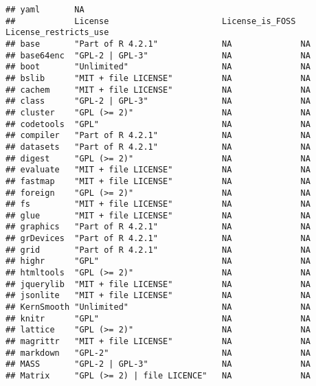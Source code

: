\documentclass[
]{article}
\begin{document}
\begin{verbatim}
## yaml       NA                                                                   
##            License                       License_is_FOSS License_restricts_use
## base       "Part of R 4.2.1"             NA              NA                   
## base64enc  "GPL-2 | GPL-3"               NA              NA                   
## boot       "Unlimited"                   NA              NA                   
## bslib      "MIT + file LICENSE"          NA              NA                   
## cachem     "MIT + file LICENSE"          NA              NA                   
## class      "GPL-2 | GPL-3"               NA              NA                   
## cluster    "GPL (>= 2)"                  NA              NA                   
## codetools  "GPL"                         NA              NA                   
## compiler   "Part of R 4.2.1"             NA              NA                   
## datasets   "Part of R 4.2.1"             NA              NA                   
## digest     "GPL (>= 2)"                  NA              NA                   
## evaluate   "MIT + file LICENSE"          NA              NA                   
## fastmap    "MIT + file LICENSE"          NA              NA                   
## foreign    "GPL (>= 2)"                  NA              NA                   
## fs         "MIT + file LICENSE"          NA              NA                   
## glue       "MIT + file LICENSE"          NA              NA                   
## graphics   "Part of R 4.2.1"             NA              NA                   
## grDevices  "Part of R 4.2.1"             NA              NA                   
## grid       "Part of R 4.2.1"             NA              NA                   
## highr      "GPL"                         NA              NA                   
## htmltools  "GPL (>= 2)"                  NA              NA                   
## jquerylib  "MIT + file LICENSE"          NA              NA                   
## jsonlite   "MIT + file LICENSE"          NA              NA                   
## KernSmooth "Unlimited"                   NA              NA                   
## knitr      "GPL"                         NA              NA                   
## lattice    "GPL (>= 2)"                  NA              NA                   
## magrittr   "MIT + file LICENSE"          NA              NA                   
## markdown   "GPL-2"                       NA              NA                   
## MASS       "GPL-2 | GPL-3"               NA              NA                   
## Matrix     "GPL (>= 2) | file LICENCE"   NA              NA                   

\end{verbatim}
\end{document}
